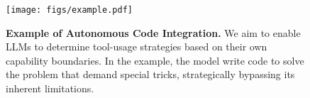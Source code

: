 \begin{figure}[t]
    \centering %
    \texttt{[image: figs/example.pdf]} %
    \caption{\small \textbf{Example of Autonomous Code Integration.} \small We aim to enable LLMs to determine tool-usage strategies
based on their own capability boundaries. In the example, the model write code to solve the problem that demand special tricks, strategically bypassing its inherent limitations.} 
    \label{fig_example}
    \vspace{-0.2cm}
\end{figure}